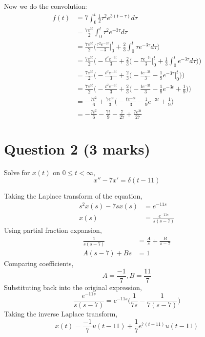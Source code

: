 \documentclass[12pt]{article}
\begin{document}
\noindent Now we do the convolution:
\begin{align*}
    f(t) &= 7 \int_0^{t} \frac{1}{2}\tau^2e^{3(t - \tau)} d\tau
      \\ &= \frac{7e^{3t}}{2} \int_0^t \tau^2e^{-3\tau} d\tau
      \\ &= \frac{7e^{3t}}{2}
        \bigg(\frac{\tau^2e^{-3\tau}}{-3} \bigg|_0^t
        + \frac{2}{3} \int_0^t \tau e^{-3\tau} d\tau \bigg)
      \\ &= \frac{7e^{3t}}{2} \bigg(-\frac{t^2e^{-3t}}{3}
        + \frac{2}{3} \bigg(-\frac{\tau e^{-3\tau}}{3} \bigg|_0^t
        + \frac{1}{3} \int_0^t e^{-3\tau} d\tau \bigg) \bigg)
      \\ &= \frac{7e^{3t}}{2} \bigg(-\frac{t^2e^{-3t}}{3}
        + \frac{2}{3} \bigg(-\frac{te^{-3t}}{3}
        - \frac{1}{9} e^{-3\tau} \bigg|_0^t \bigg) \bigg)
      \\ &= \frac{7e^{3t}}{2} \bigg(-\frac{t^2e^{-3t}}{3}
        + \frac{2}{3} \bigg(-\frac{te^{-3t}}{3}
        - \frac{1}{9} e^{-3t} + \frac{1}{9} \bigg) \bigg)
      \\ &= -\frac{7t^2}{6}
        + \frac{7e^{3t}}{3} \bigg(-\frac{te^{-3t}}{3}
        - \frac{1}{9} e^{-3t} + \frac{1}{9} \bigg)
      \\ &= -\frac{7t^2}{6} -\frac{7t}{9}
        - \frac{7}{27} + \frac{7e^{3t}}{27}
\end{align*}

\section*{Question 2 (3 marks)}
Solve for $x(t)$ on $0 \leq t < \infty$, $$x''-7x'=\delta(t-11)$$

\noindent Taking the Laplace transform of the equation,
\begin{align*}
  s^2x(s) - 7sx(s) &= e^{-11s} \\
  x(s) &= \frac{e^{-11s}}{s(s-7)}
\end{align*}
Using partial fraction expansion,
\begin{align*}
  \frac{1}{s(s-7)} &= \frac{A}{s} + \frac{B}{s-7} \\
  A(s-7) + Bs &= 1
\end{align*}
Comparing coefficients, $$A=\frac{-1}{7}, B=\frac{11}{7}$$ Substituting back into the original expression, $$\frac{e^{-11s}}{s(s-7)} = e^{-11s}\bigg(\frac{1}{7s} - \frac{1}{7(s-7)}\bigg)$$ Taking the inverse Laplace transform, $$x(t)=\frac{-1}{7}u(t-11) + \frac{1}{7}e^{7(t-11)}u(t-11)$$
\end{document}
